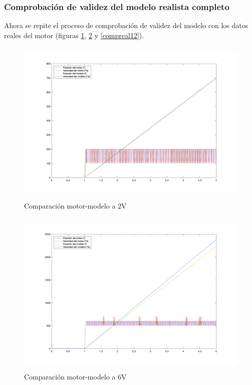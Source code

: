 \documentclass[a4paper, 12pt]{article}
\begin{document}
\subsubsection{Comprobación de validez del modelo realista completo}
Ahora se repite el proceso de comprobación de validez del modelo con los datos reales del motor (figuras \ref{compreal02}, \ref{compreal06} y \ref{compreal12}).
\begin{figure}[H] 
	\centering
	\includegraphics[height=8cm]{figs/p3/encodersmotormodelo2V} 
	\caption{Comparación motor-modelo a 2V} \label{compreal02}
\end{figure}
\begin{figure}[H]
	\centering
	\includegraphics[height=8cm]{figs/p3/encodersmotormodelo6V} 
	\caption{Comparación motor-modelo a 6V} \label{compreal06}
\end{figure}
\end{document}
